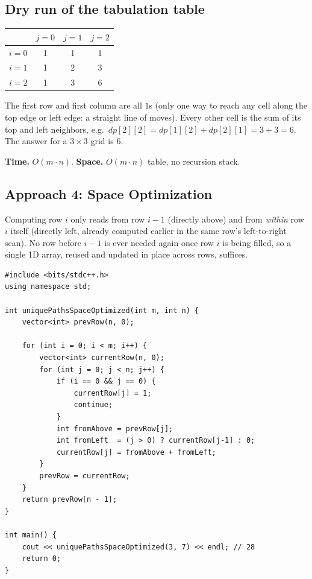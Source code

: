 \subsection*{Dry run of the tabulation table}


\begin{center}
\begin{tabular}{c|c|c|c}
 & $j=0$ & $j=1$ & $j=2$ \\ \hline
$i=0$ & 1 & 1 & 1 \\ \hline
$i=1$ & 1 & 2 & 3 \\ \hline
$i=2$ & 1 & 3 & 6
\end{tabular}
\end{center}

The first row and first column are all $1$s (only one way to reach any
cell along the top edge or left edge: a straight line of moves). Every
other cell is the sum of its top and left neighbors, e.g.\ $dp[2][2] =
dp[1][2]+dp[2][1] = 3+3=6$. The answer for a $3\times3$ grid is $6$.

\begin{complexitybox}
\textbf{Time.} $O(m \cdot n)$.
\textbf{Space.} $O(m \cdot n)$ table, no recursion stack.
\end{complexitybox}

\subsection*{Approach 4: Space Optimization}

\begin{ideabox}
Computing row $i$ only reads from row $i-1$ (directly above) and from
\emph{within} row $i$ itself (directly left, already computed earlier in
the same row's left-to-right scan). No row before $i-1$ is ever needed
again once row $i$ is being filled, so a single 1D array, reused and
updated in place across rows, suffices.
\end{ideabox}

\begin{lstlisting}
#include <bits/stdc++.h>
using namespace std;

int uniquePathsSpaceOptimized(int m, int n) {
    vector<int> prevRow(n, 0);

    for (int i = 0; i < m; i++) {
        vector<int> currentRow(n, 0);
        for (int j = 0; j < n; j++) {
            if (i == 0 && j == 0) {
                currentRow[j] = 1;
                continue;
            }
            int fromAbove = prevRow[j];
            int fromLeft  = (j > 0) ? currentRow[j-1] : 0;
            currentRow[j] = fromAbove + fromLeft;
        }
        prevRow = currentRow;
    }
    return prevRow[n - 1];
}

int main() {
    cout << uniquePathsSpaceOptimized(3, 7) << endl; // 28
    return 0;
}
\end{lstlisting}

